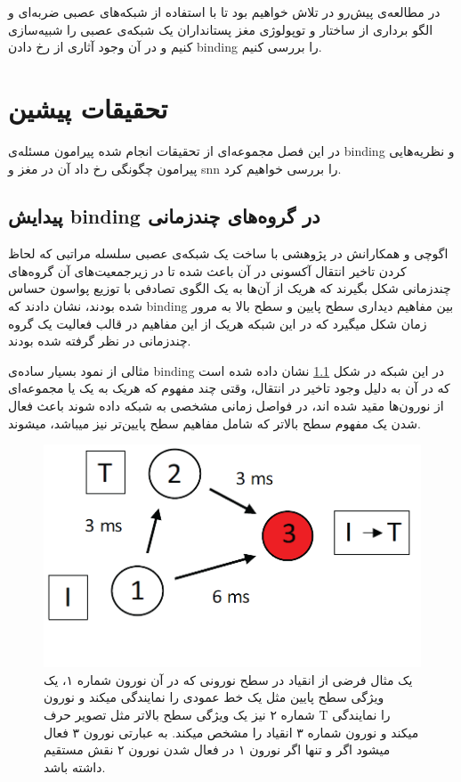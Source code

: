 \documentclass[12pt]{report}
\begin{document}
	در مطالعه‌ی پیش‌رو در تلاش خواهیم بود تا با استفاده از شبکه‌های عصبی ضربه‌ای و الگو برداری از ساختار و توپولوژی مغز پستانداران یک شبکه‌ی عصبی را شبیه‌سازی کنیم و در آن وجود آثاری از رخ دادن \gls{binding} را بررسی کنیم.
	
	
	\chapter{تحقیقات پیشین}
	
	در این فصل مجموعه‌ای از تحقیقات انجام شده پیرامون مسئله‌ی \gls{binding} و نظریه‌هایی پیرامون چگونگی رخ داد آن در مغز و \gls{snn} را بررسی خواهیم کرد.
	
	
	\section{پیدایش \gls{binding} در گروه‌های چندزمانی}
	اگوچی و همکارانش در پژوهشی
	\cite{EGUCHI2018a}
	با ساخت یک شبکه‌ی عصبی سلسله مراتبی که لحاظ کردن تاخیر انتقال آکسونی در آن باعث شده تا در زیرجمعیت‌های آن گروه‌های چندزمانی\cite{Izhikevich2006-dy} شکل بگیرند که هریک از آن‌ها به یک الگوی تصادفی با توزیع پواسون حساس شده بودند، نشان دادند که \gls{binding} بین مفاهیم دیداری سطح پایین و سطح بالا به مرور زمان شکل میگیرد که در این شبکه هریک از این مفاهیم در قالب فعالیت یک گروه چندزمانی در نظر گرفته شده بودند.
	
	مثالی از نمود بسیار ساده‌ی \gls{binding} در این شبکه در شکل \ref{fig:eguchi-binding} نشان داده شده است که در آن به دلیل وجود تاخیر در انتقال، وقتی چند مفهوم که هریک به یک یا مجموعه‌ای از نورون‌ها مقید شده اند، در فواصل زمانی مشخصی به شبکه داده شوند باعث فعال شدن یک مفهوم سطح بالاتر که شامل مفاهیم سطح پایین‌تر نیز میباشد، میشوند. 
	
	\begin{figure}[H]
		\centering
		\includegraphics[width=0.7\linewidth]{poly-bind.png}
		\caption[NS]{
			یک مثال فرضی از انقیاد در سطح نورونی که در آن نورون شماره ۱، یک ویژگی سطح پایین مثل یک خط عمودی را نمایندگی میکند و نورون شماره ۲ نیز یک ویژگی سطح بالاتر مثل تصویر حرف T را نمایندگی میکند و نورون شماره ۳ انقیاد را مشخص میکند. به عبارتی نورون ۳ فعال میشود اگر و تنها اگر نورون ۱ در فعال شدن نورون ۲ نقش مستقیم داشته باشد.
		}
		\label{fig:eguchi-binding}
	\end{figure}
	
\end{document}
